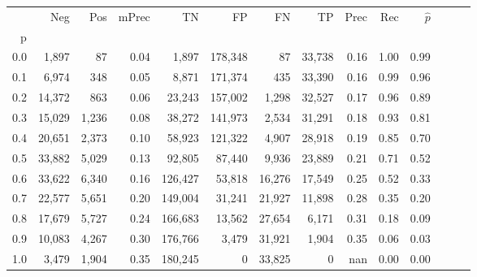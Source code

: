 \begin{tabular}{rrrrrrrrrrrrrr}
\toprule
{} &     Neg &    Pos & mPrec &       TN &       FP &      FN &      TP &  Prec &   Rec & $\hat{p}$ \\
p   &         &        &       &          &          &         &         &       &       &           \\
\midrule
0.0 &   1,897 &     87 &  0.04 &    1,897 &  178,348 &      87 &  33,738 &  0.16 &  1.00 &      0.99 \\
0.1 &   6,974 &    348 &  0.05 &    8,871 &  171,374 &     435 &  33,390 &  0.16 &  0.99 &      0.96 \\
0.2 &  14,372 &    863 &  0.06 &   23,243 &  157,002 &   1,298 &  32,527 &  0.17 &  0.96 &      0.89 \\
0.3 &  15,029 &  1,236 &  0.08 &   38,272 &  141,973 &   2,534 &  31,291 &  0.18 &  0.93 &      0.81 \\
0.4 &  20,651 &  2,373 &  0.10 &   58,923 &  121,322 &   4,907 &  28,918 &  0.19 &  0.85 &      0.70 \\
0.5 &  33,882 &  5,029 &  0.13 &   92,805 &   87,440 &   9,936 &  23,889 &  0.21 &  0.71 &      0.52 \\
0.6 &  33,622 &  6,340 &  0.16 &  126,427 &   53,818 &  16,276 &  17,549 &  0.25 &  0.52 &      0.33 \\
0.7 &  22,577 &  5,651 &  0.20 &  149,004 &   31,241 &  21,927 &  11,898 &  0.28 &  0.35 &      0.20 \\
0.8 &  17,679 &  5,727 &  0.24 &  166,683 &   13,562 &  27,654 &   6,171 &  0.31 &  0.18 &      0.09 \\
0.9 &  10,083 &  4,267 &  0.30 &  176,766 &    3,479 &  31,921 &   1,904 &  0.35 &  0.06 &      0.03 \\
1.0 &   3,479 &  1,904 &  0.35 &  180,245 &        0 &  33,825 &       0 &   nan &  0.00 &      0.00 \\
\bottomrule
\end{tabular}
